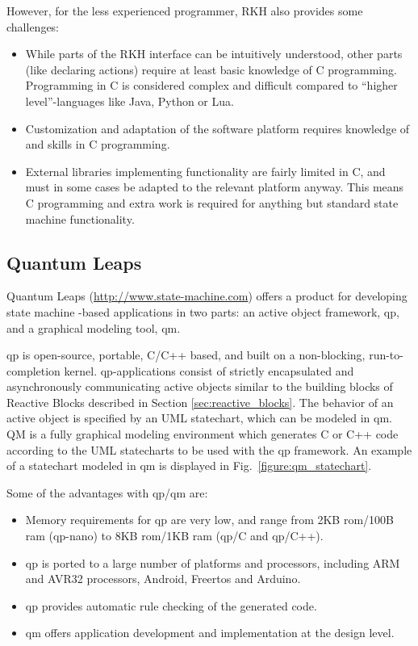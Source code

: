 However, for the less experienced programmer, RKH also provides some challenges:
\begin{itemize}
	\item While parts of the RKH interface can be intuitively understood, other parts (like declaring actions) require at least basic knowledge of C programming. Programming in C is considered complex and difficult compared to ``higher level''-languages like Java, Python or Lua.
	\item Customization and adaptation of the software platform requires knowledge of and skills in C programming.
	\item External libraries implementing functionality are fairly limited in C, and must in some cases be adapted to the relevant platform anyway. This means C programming and extra work is required for anything but standard state machine functionality.
\end{itemize}

\subsection{Quantum Leaps}
\label{sec:quantum_leaps}
Quantum Leaps (\url{http://www.state-machine.com}) offers a product for developing state machine -based applications in two parts: an active object framework, \gls{qp}, and a graphical modeling tool, \gls{qm}.

\gls{qp} is open-source, portable, C/C++ based, and built on a non-blocking, run-to-completion kernel. \gls{qp}-applications consist of strictly encapsulated and asynchronously communicating active objects similar to the building blocks of Reactive Blocks described in Section \ref{sec:reactive_blocks}. The behavior of an active object is specified by an UML statechart, which can be modeled in \gls{qm}. QM is a fully graphical modeling environment which generates C or C++ code according to the UML statecharts to be used with the \gls{qp} framework. An example of a statechart modeled in \gls{qm} is displayed in Fig.~\ref{figure:qm_statechart}.

Some of the advantages with \gls{qp}/\gls{qm} are:
\begin{itemize}
	\item Memory requirements for \gls{qp} are very low, and range from 2KB \gls{rom}/100B \gls{ram} (\gls{qp}-nano) to 8KB \gls{rom}/1KB \gls{ram} (\gls{qp}/C and \gls{qp}/C++).
	\item \gls{qp} is ported to a large number of platforms and processors, including ARM and AVR32 processors, Android, Free\gls{rtos} and Arduino.
	\item \gls{qp} provides automatic rule checking of the generated code.
	\item \gls{qm} offers application development and implementation at the design level.
\end{itemize}

